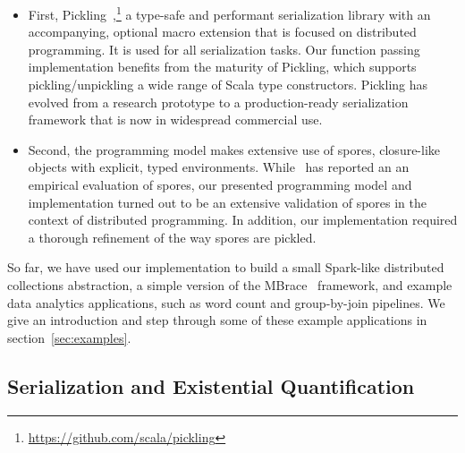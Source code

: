 \documentclass[10pt]{sigplanconf}
\theoremstyle{definition}
\theoremstyle{definition}
\begin{document}
\begin{itemize}

\item First, Pickling~\cite{Pickling},\footnote{\url{https://github.com/scala/pickling}}
  a type-safe and performant serialization library with an accompanying, optional
  macro extension that is focused on distributed programming. It is used for
  all serialization tasks. Our function passing implementation benefits from the maturity of
  Pickling, which supports pickling/unpickling a wide range of Scala type
  constructors. Pickling has evolved from a research prototype to a
  production-ready serialization framework that is now in widespread commercial
  use.

\item Second, the programming model makes extensive use of spores, closure-like
  objects with explicit, typed environments. While~\cite{Spores} has reported an
  an empirical evaluation of spores, our presented programming model and
  implementation turned out to be an extensive validation of spores in the context
  of distributed programming. In addition, our implementation required a thorough
  refinement of the way spores are pickled.

\end{itemize}

So far, we have used our implementation to build a small Spark-like distributed
collections abstraction, a simple version of the MBrace~\cite{MBrace} framework,
and example data analytics applications, such as word count and group-by-join
pipelines. We give an introduction and step through some of these example
applications in section~\ref{sec:examples}.



\subsection{Serialization and Existential Quantification}
\end{document}
